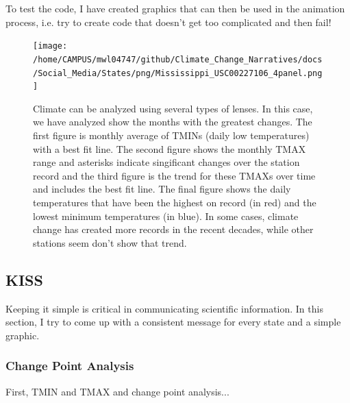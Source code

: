 \documentclass{article}
\begin{document}
To test the code, I have created graphics that can then be used in the animation process, i.e. try to create code that doesn't get too complicated and then fail! 

\begin{knitrout}
\color{fgcolor}\begin{kframe}


{\ttfamily\noindent\bfseries\color{errorcolor}{\#\# Error in seq(min(GSOM\$Year), max(GSOM\$Year), by = 2): object 'GSOM' not found}}

{\ttfamily\noindent\bfseries\color{errorcolor}{\#\# Error in eval(expr, envir, enclos): no loop for break/next, jumping to top level}}

{\ttfamily\noindent\bfseries\color{errorcolor}{\#\# Error in eval(expr, envir, enclos): no loop for break/next, jumping to top level}}\end{kframe}
\end{knitrout}

\begin{figure}
\texttt{[image: /home/CAMPUS/mwl04747/github/Climate\_Change\_Narratives/docs/Social\_Media/States/png/Mississippi\_USC00227106\_4panel.png]}
\caption{Climate can be analyzed using several types of lenses. In this case, we have analyzed show the months with the greatest changes. The first figure is monthly average of TMINs (daily low temperatures) with a best fit line. The second figure shows the monthly TMAX range and asterisks indicate singificant changes over the station record and the third figure is the trend for these TMAXs over time and includes the best fit line. The final figure shows the daily temperatures that have been the highest on record (in red) and the lowest minimum temperatures (in blue). In some cases, climate change has created more records in the recent decades, while other stations seem don't show that trend.}
\label{fig:4panel}
\end{figure}

\subsection{KISS}

Keeping it simple is critical in communicating scientific information. In this section, I try to come up with a consistent message for every state and a simple graphic. 

\subsubsection{Change Point Analysis}
First, TMIN and TMAX and change point analysis...
\end{document}
